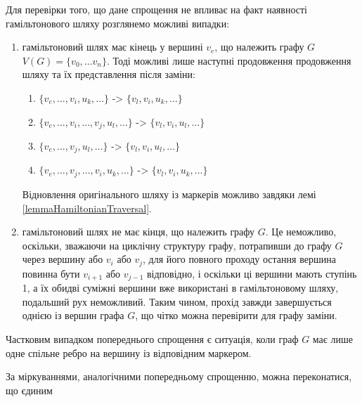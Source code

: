 \documentclass[a4paper,14pt,ukrainian]{extarticle}
\begin{document}
    Для перевірки того, що дане спрощення не впливає на факт наявності гамільтонового шляху розглянемо можливі випадки:
    \begin{enumerate}
        \item гамільтоновий шлях має кінець у вершині $v_e$, що належить графу $G$ $V(G) = \{ v_0, \dots v_n \}$.
            Тоді можливі лише наступні продовження продовження шляху та їх представлення після заміни:
            \begin{enumerate}
                \item $\{ v_e, \dots, v_i, u_k, \dots \}$ -> $\{ v_l, v_i, u_k, \dots \}$
                \item $\{ v_e, \dots, v_i, \dots, v_j, u_l, \dots \}$ -> $\{ v_l, v_i, u_l, \dots \}$
                \item $\{ v_e, \dots, v_j, u_l, \dots \}$ -> $\{ v_l, v_i, u_l, \dots \}$
                \item $\{ v_e, \dots, v_j, \dots, v_i, u_k, \dots \}$ -> $\{ v_l, v_i, u_k, \dots \}$
            \end{enumerate}
            Відновлення оригінального шляху із маркерів можливо завдяки лемі \ref{lemmaHamiltonianTraversal}.
        \item гамільтоновий шлях не має кінця, що належить графу $G$.
            Це неможливо, оскільки, зважаючи на циклічну структуру графу, потрапивши до графу $G$ через вершину або $v_i$ або $v_j$, для його повного проходу остання вершина повинна бути $v_{i+1}$ або $v_{j-1}$ відповідно, і оскільки ці вершини мають ступінь 1, а їх обидві суміжні вершини вже використані в гамільтоновому шляху, подальший рух неможливий.
            Таким чином, прохід завжди завершується однією із вершин графа $G$, що чітко можна перевірити для графу заміни.
    \end{enumerate}

    Частковим випадком попереднього спрощення є ситуація, коли граф $G$ має лише одне спільне ребро на вершину із відповідним маркером.
    \begin{figure}[h]
        \centering
    \end{figure}

    За міркуваннями, аналогічними попередньому спрощенню, можна переконатися, що єдиним 
\end{document}
